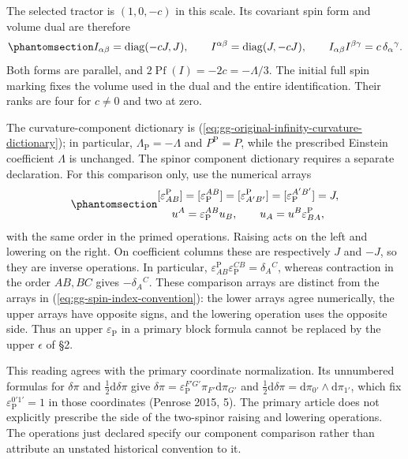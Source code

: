 \documentclass[
  english,
  11pt,
  reqno]{amsart}
\begin{document}
The selected tractor is \((1,0,-c)\) in this scale. Its covariant spin
form and volume dual are therefore
\begin{equation}\protect\phantomsection\label{eq:gg-original-infinity-product}{
 I_{\alpha\beta}=\operatorname{diag}(-cJ,J),\qquad
 I^{\alpha\beta}=\operatorname{diag}(J,-cJ),\qquad
 I_{\alpha\beta}I^{\beta\gamma}
                   =c\,\delta_\alpha{}^\gamma .
}\end{equation} Both forms are parallel, and
\(2\operatorname{Pf}(I)=-2c=-\Lambda/3\). The initial full spin marking
fixes the volume used in the dual and the entire identification. Their
ranks are four for \(c\ne0\) and two at zero.

The curvature-component dictionary is
(\ref{eq:gg-original-infinity-curvature-dictionary}); in particular,
\(\Lambda_{\mathrm P}=-\Lambda\) and \(P^{\mathrm P}=P\), while the
prescribed Einstein coefficient \(\Lambda\) is unchanged. The spinor
component dictionary requires a separate declaration. For this
comparison only, use the numerical arrays
\begin{equation}\protect\phantomsection\label{eq:gg-original-infinity-external-spinor-convention}{
 \begin{gathered}
 [\varepsilon^{\mathrm P}_{AB}]
 =[\varepsilon_{\mathrm P}^{AB}]
 =[\varepsilon^{\mathrm P}_{A'B'}]
 =[\varepsilon_{\mathrm P}^{A'B'}]=J,\\
 u^A=\varepsilon_{\mathrm P}^{AB}u_B,\qquad
 u_A=u^B\varepsilon^{\mathrm P}_{BA},
 \end{gathered}
}\end{equation} with the same order in the primed operations. Raising
acts on the left and lowering on the right. On coefficient columns these
are respectively \(J\) and \(-J\), so they are inverse operations. In
particular,
\(\varepsilon^{\mathrm P}_{AB}\varepsilon_{\mathrm P}^{CB}=\delta_A{}^C\),
whereas contraction in the order \(AB,BC\) gives \(-\delta_A{}^C\).
These comparison arrays are distinct from the arrays in
(\ref{eq:gg-spin-index-convention}): the lower arrays agree numerically,
the upper arrays have opposite signs, and the lowering operation uses
the opposite side. Thus an upper \(\varepsilon_{\mathrm P}\) in a
primary block formula cannot be replaced by the upper \(\epsilon\) of
§2.

This reading agrees with the primary coordinate normalization. Its
unnumbered formulas for \(\delta\pi\) and \(\tfrac12\mathrm d\delta\pi\)
give
\(\delta\pi=\varepsilon_{\mathrm P}^{F'G'}\pi_{F'}\mathrm d\pi_{G'}\)
and
\(\tfrac12\mathrm d\delta\pi=\mathrm d\pi_{0'}\wedge\mathrm d\pi_{1'}\),
which fix \(\varepsilon_{\mathrm P}^{0'1'}=1\) in those coordinates
(Penrose 2015, 5). The primary article does not explicitly prescribe the
side of the two-spinor raising and lowering operations. The operations
just declared specify our component comparison rather than attribute an
unstated historical convention to it.
\end{document}
